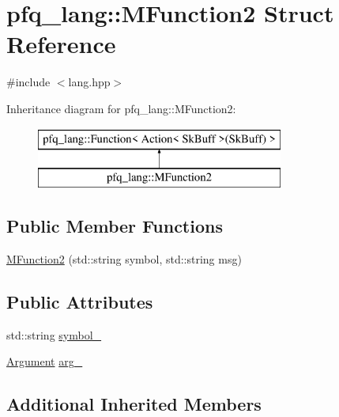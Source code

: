 \hypertarget{structpfq__lang_1_1MFunction2}{\section{pfq\+\_\+lang\+:\+:M\+Function2 Struct Reference}
\label{structpfq__lang_1_1MFunction2}
}


{\ttfamily \#include $<$lang.\+hpp$>$}

Inheritance diagram for pfq\+\_\+lang\+:\+:M\+Function2\+:\begin{figure}[H]
\begin{center}
\leavevmode
\includegraphics[height=2.000000cm]{structpfq__lang_1_1MFunction2}
\end{center}
\end{figure}
\subsection*{Public Member Functions}
\begin{DoxyCompactItemize}
\item 
\hyperlink{structpfq__lang_1_1MFunction2_aa0ee0ece97ba1a6b58130f374a9c5f3c}{M\+Function2} (std\+::string symbol, std\+::string msg)
\end{DoxyCompactItemize}
\subsection*{Public Attributes}
\begin{DoxyCompactItemize}
\item 
std\+::string \hyperlink{structpfq__lang_1_1MFunction2_a1cf86ea54a5fedb9bfa27fa7866554d0}{symbol\+\_\+}
\item 
\hyperlink{structpfq__lang_1_1Argument}{Argument} \hyperlink{structpfq__lang_1_1MFunction2_a0928b4336ac51e05036af896b479d3b7}{arg\+\_\+}
\end{DoxyCompactItemize}
\subsection*{Additional Inherited Members}


